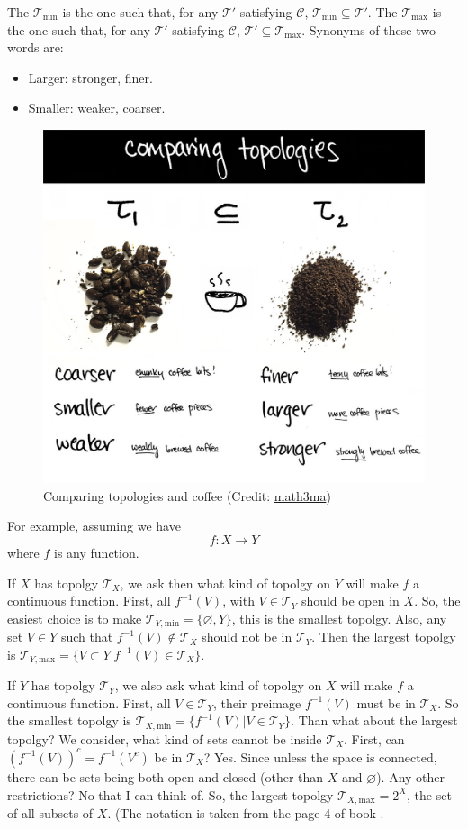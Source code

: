 The  $\mathcal{T}_\text{min}$ is the one such
that, for any $\mathcal{T}'$ satisfying $\mathcal{C}$,
$\mathcal{T}_\text{min}\subseteq \mathcal{T}'$. The  $\mathcal{T}_\text{max}$ is the one such that, for any
$\mathcal{T}'$ satisfying $\mathcal{C}$, $\mathcal{T}'\subseteq
\mathcal{T}_\text{max}$.
Synonyms of these two words are:
\begin{itemize}
    \item Larger: stronger, finer.
    \item Smaller: weaker, coarser.
\end{itemize}
\begin{figure}[H]
    \centering
    \includegraphics[width=0.65\linewidth]{pics/comparing-topologies-and-coffee.jpg}
    \caption{Comparing topologies and coffee (Credit:
    \href{http://www.math3ma.com/the-back-pocket/2016/8/26/comparing-topologies}{math3ma})}
\end{figure}
For example, assuming we have
\begin{equation}
    f: X\to Y
\end{equation}
where $f$ is any function.

If $X$ has topolgy $\mathcal{T}_X$, we ask then what kind of topolgy on
$Y$ will make $f$ a continuous function. First, all $f^{-1}(V)$, with
$V\in \mathcal{T}_Y$ should be open in $X$. So, the easiest choice is to
make $\mathcal{T}_{Y,\text{min}}=\{\varnothing,Y\}$, this is the
smallest topolgy.  Also, any set $V\in Y$ such that $f^{-1}(V)\notin
\mathcal{T}_X$ should not be in $\mathcal{T}_Y$. Then the largest
topolgy is $\mathcal{T}_{Y,\text{max}}=\{ V\subset Y| f^{-1}(V)\in
\mathcal{T}_X\}$.

If $Y$ has topolgy $\mathcal{T}_Y$, we also ask what kind of topolgy
on $X$ will make $f$ a continuous function. First, all $V\in
\mathcal{T}_Y$, their preimage $f^{-1}(V)$ must be in $\mathcal{T}_X$.
So the smallest topolgy is
$\mathcal{T}_{X,\text{min}}=\{f^{-1}(V)|V\in\mathcal{T}_Y\}$. Than
what about the largest topolgy? We consider, what kind of sets cannot
be inside $\mathcal{T}_X$. First, can $(f^{-1}(V))^c=f^{-1}(V^c)$ be
in $\mathcal{T}_X$? Yes. Since unless the space is connected, there
can be sets being both open and closed (other than $X$ and
$\varnothing$). Any other restrictions? No that I can think of. So,
the largest topolgy $\mathcal{T}_{X,\text{max}}=2^X$, the set of all
subsets of $X$. (The notation  is taken from the page 4
of book \cite{Singer.Thorpe}.


